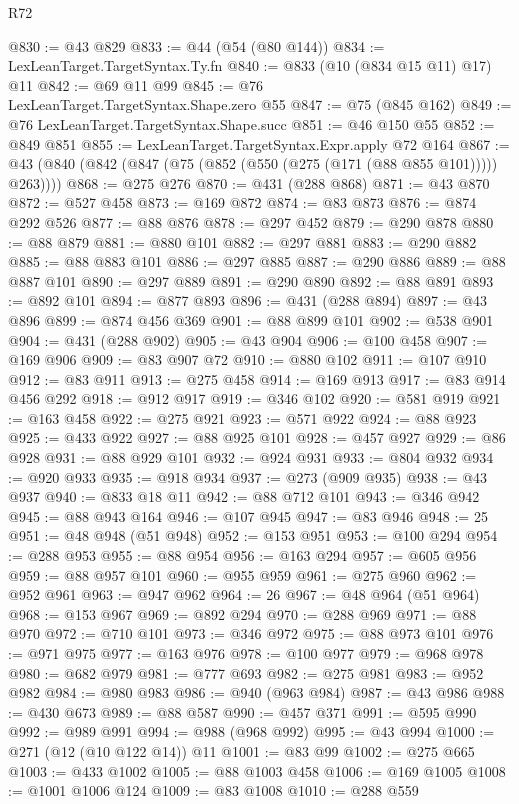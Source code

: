 \begin{lexlean}{R72}
\begin{coremodule}
@830 := @43 @829
@833 := @44 (@54 (@80 @144))
@834 := LexLeanTarget.TargetSyntax.Ty.fn
@840 := @833 (@10 (@834 @15 @11) @17) @11
@842 := @69 @11 @99
@845 := @76 LexLeanTarget.TargetSyntax.Shape.zero @55
@847 := @75 (@845 @162)
@849 := @76 LexLeanTarget.TargetSyntax.Shape.succ
@851 := @46 @150 @55
@852 := @849 @851
@855 := LexLeanTarget.TargetSyntax.Expr.apply @72 @164
@867 := @43 (@840 (@842 (@847 (@75 (@852 (@550 (@275 (@171 (@88 @855 @101))))) @263))))
@868 := @275 @276
@870 := @431 (@288 @868)
@871 := @43 @870
@872 := @527 @458
@873 := @169 @872
@874 := @83 @873
@876 := @874 @292 @526
@877 := @88 @876
@878 := @297 @452
@879 := @290 @878
@880 := @88 @879
@881 := @880 @101
@882 := @297 @881
@883 := @290 @882
@885 := @88 @883 @101
@886 := @297 @885
@887 := @290 @886
@889 := @88 @887 @101
@890 := @297 @889
@891 := @290 @890
@892 := @88 @891
@893 := @892 @101
@894 := @877 @893
@896 := @431 (@288 @894)
@897 := @43 @896
@899 := @874 @456 @369
@901 := @88 @899 @101
@902 := @538 @901
@904 := @431 (@288 @902)
@905 := @43 @904
@906 := @100 @458
@907 := @169 @906
@909 := @83 @907 @72
@910 := @880 @102
@911 := @107 @910
@912 := @83 @911
@913 := @275 @458
@914 := @169 @913
@917 := @83 @914 @456 @292
@918 := @912 @917
@919 := @346 @102
@920 := @581 @919
@921 := @163 @458
@922 := @275 @921
@923 := @571 @922
@924 := @88 @923
@925 := @433 @922
@927 := @88 @925 @101
@928 := @457 @927
@929 := @86 @928
@931 := @88 @929 @101
@932 := @924 @931
@933 := @804 @932
@934 := @920 @933
@935 := @918 @934
@937 := @273 (@909 @935)
@938 := @43 @937
@940 := @833 @18 @11
@942 := @88 @712 @101
@943 := @346 @942
@945 := @88 @943 @164
@946 := @107 @945
@947 := @83 @946
@948 := 25
@951 := @48 @948 (@51 @948)
@952 := @153 @951
@953 := @100 @294
@954 := @288 @953
@955 := @88 @954
@956 := @163 @294
@957 := @605 @956
@959 := @88 @957 @101
@960 := @955 @959
@961 := @275 @960
@962 := @952 @961
@963 := @947 @962
@964 := 26
@967 := @48 @964 (@51 @964)
@968 := @153 @967
@969 := @892 @294
@970 := @288 @969
@971 := @88 @970
@972 := @710 @101
@973 := @346 @972
@975 := @88 @973 @101
@976 := @971 @975
@977 := @163 @976
@978 := @100 @977
@979 := @968 @978
@980 := @682 @979
@981 := @777 @693
@982 := @275 @981
@983 := @952 @982
@984 := @980 @983
@986 := @940 (@963 @984)
@987 := @43 @986
@988 := @430 @673
@989 := @88 @587
@990 := @457 @371
@991 := @595 @990
@992 := @989 @991
@994 := @988 (@968 @992)
@995 := @43 @994
@1000 := @271 (@12 (@10 @122 @14)) @11
@1001 := @83 @99
@1002 := @275 @665
@1003 := @433 @1002
@1005 := @88 @1003 @458
@1006 := @169 @1005
@1008 := @1001 @1006 @124
@1009 := @83 @1008
@1010 := @288 @559

\end{coremodule}
\end{lexlean}
